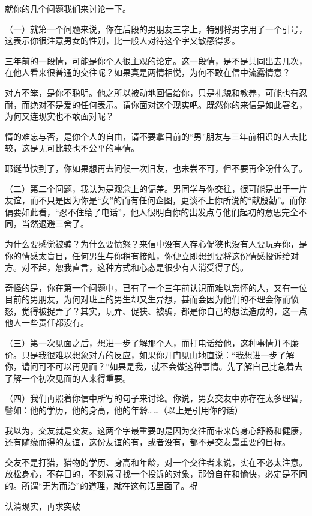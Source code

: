 \par {}
\par 就你的几个问题我们来讨论一下。
\par （一）就第一个问题来说，你在后段的男朋友三字上，特别将男字用了一个引号，这表示你很注意男女的性别，比一般人对待这个字又敏感得多。
\par 三年前的一段情，可能是你个人很主观的论定。这一段情，是不是共同出去几次，在他人看来很普通的交往呢？如果真是两情相悦，为何不敢在信中流露情意？
\par 对方不笨，是你不聪明。他之所以被动地回信给你，只是礼貌和教养，可能也有忍耐，而绝对不是爱的任何表示。请你面对这个现实吧。既然你的来信是如此署名，为何又连现实也不敢面对呢？
\par 情的难忘与否，是你个人的自由，请不要拿目前的“男”朋友与三年前相识的人去比较，这是无可比较也不公平的事情。
\par 耶诞节快到了，你如果想再去问候一次旧友，也未尝不可，但不要再企盼什么了。
\par （二）第二个问题，我认为是观念上的偏差。男同学与你交往，很可能是出于一片友谊，而不只是因为你是“女”的而有任何企图，更谈不上你所说的“献殷勤”。而你偏要如此看，“忍不住给了电话”，他人很明白你的出发点与他们起初的意思完全不同，当然退避三舍了。
\par 为什么要感觉被骗？为什么要愤怒？来信中没有人存心促狭也没有人要玩弄你，是你的情感太盲目，任何男生与你稍有接触，你便立即想到要将这份情感投诉给对方。对不起，恕我直言，这种方式和心态是很少有人消受得了的。
\par 奇怪的是，你在第一个问题中，已有了一个三年前认识而难以忘怀的人，又有一位目前的男朋友，为何对班上的男生却又生异想，甚而会因为他们的不理会你而愤怒，觉得被捉弄了？其实，玩弄、促狭、被骗，都是你自己的想法造成的，这一点他人一些责任都没有。
\par （三）第一次见面之后，想进一步了解那个人，而打电话给他，这种事情并不廉价。只是我很难以想象对方的反应，如果你开门见山地直说：“我想进一步了解你，请问可不可以再见面？”如果是我，就不会做这种事情。先了解自己比急着去了解一个初次见面的人来得重要。
\par （四）我们再照着你信中所写的句子来讨论。你说，男女交友中亦存在太多理智，譬如：他的学历，他的身高，他的年龄……（以上是引用你的话）
\par 我以为，交友就是交友。这两个字最重要的是因为交往而带来的身心舒畅和健康，还有随缘而得的友谊，这份友谊的有，或者没有，都不是交友最重要的目标。
\par 交友不是打猎，猎物的学历、身高和年龄，对一个交往者来说，实在不必太注意。放松身心，不存目的，不刻意寻找一个投诉的对象，那份自在和愉快，必定是不同的。所谓“无为而治”的道理，就在这句话里面了。祝
\par 认清现实，再求突破
\par {}


